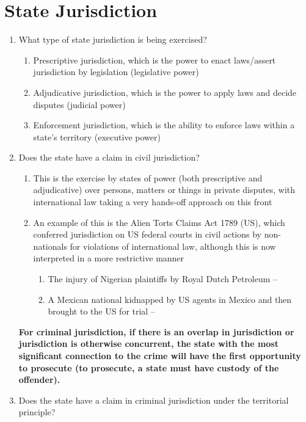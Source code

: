 \section{State Jurisdiction}
\begin{enumerate}
    \item What type of state jurisdiction is being exercised?
    \begin{enumerate}
        \item Prescriptive jurisdiction, which is the power to enact laws/assert jurisdiction by legislation (legislative power)
        \item Adjudicative jurisdiction, which is the power to apply laws and decide disputes (judicial power)
        \item Enforcement jurisdiction, which is the ability to enforce laws within a state's territory (executive power)
    \end{enumerate}
    \item Does the state have a claim in civil jurisdiction?
    \begin{enumerate}
        \item This is the exercise by states of power (both prescriptive and adjudicative) over persons, matters or things in private disputes, with international law taking a very hands-off approach on this front
        \item An example of this is the Alien Torts Claims Act 1789 (US), which conferred jurisdiction on US federal courts in civil actions by non-nationals for violations of international law, although this is now interpreted in a more restrictive manner
        \begin{enumerate}
            \item The injury of Nigerian plaintiffs by Royal Dutch Petroleum -- 
            \item A Mexican national kidnapped by US agents in Mexico and then brought to the US for trial -- 
        \end{enumerate}
    \end{enumerate}
    \textbf{For criminal jurisdiction, if there is an overlap in jurisdiction or jurisdiction is otherwise concurrent, the state with the most significant connection to the crime will have the first opportunity to prosecute (to prosecute, a state must have custody of the offender).}
    \item Does the state have a claim in criminal jurisdiction under the territorial principle?

\end{enumerate}
